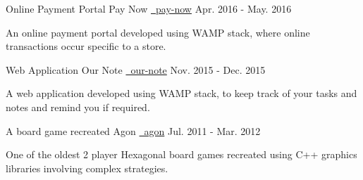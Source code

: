 \begin{cventries}
  \cventry
    {Online Payment Portal}
    {Pay Now}
    {\href{https://github.com/mukeshmk/pay-now}{\faGithubSquare\ pay-now}}
    {Apr. 2016 - May. 2016}
    {
      \begin{cvitems}
        \item {An online payment portal developed using WAMP stack, where online transactions occur specific to a store.}
      \end{cvitems}
    }
  \cventry
    {Web Application}
    {Our Note}
    {\href{https://github.com/mukeshmk/our-note}{\faGithubSquare\ our-note}}
    {Nov. 2015 - Dec. 2015}
    {
      \begin{cvitems}
        \item {A web application developed using WAMP stack, to keep track of your tasks and notes and remind you if required.}
      \end{cvitems}
    }  
  \cventry
    {A board game recreated}
    {Agon}
    {\href{https://github.com/mukeshmk/agon}{\faGithubSquare\ agon}}
    {Jul. 2011 - Mar. 2012}
    {
      \begin{cvitems}
        \item {One of the oldest 2 player Hexagonal board games recreated using C++ graphics libraries involving complex strategies.}
      \end{cvitems}
    }
\end{cventries}
